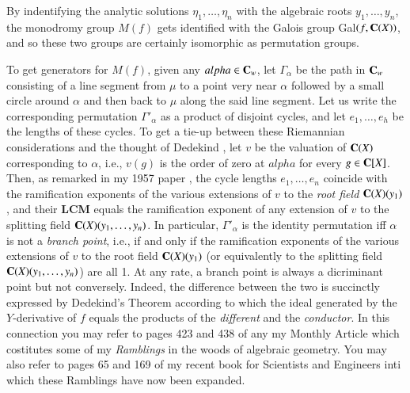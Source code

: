By indentifying the analytic solutions $\eta_{1}, \ldots, \eta_{n}$ with the algebraic roots $y_{1}, \ldots, y_{n}$, the monodromy group $M(f)$ gets identified with the Galois group Gal$(f, \mathbf{C}(X))$, and so these two groups are certainly isomorphic as permutation groups.

To get generators for $M(f)$, given any $alpha \in \mathbf{C}_{w}$, let $\Gamma_{\alpha}$ be the path in $\mathbf{C}_{w}$ consisting of a line segment from $\mu$ to a point very near $\alpha$ followed by a small circle around $\alpha$ and then back to $\mu$ along the said line segment. Let us write the corresponding permutation $\Gamma'_{\alpha}$ as a product of disjoint cycles, and let $e_{1}, \ldots, e_{h}$ be the lengths of these cycles. To get a tie-up between  these Riemannian considerations and the  thought of Dedekind \cite{art1-key28}, let $v$ be the valuation of $\mathbf{C}(X)$ corresponding to $\alpha$, i.e., $v(g)$ is the order of zero at $alpha$ for every $g\in \mathbf{C}[X]$. Then, as remarked in my 1957 paper \cite{art1-key3}, the cycle lengths $e_{1}, \ldots, e_{n}$ coincide with the ramification exponents of the various extensions of $v$ to the \textit{root field} $\mathbf{C}(X)(y_{1})$, and their {\bf LCM} equals the ramification exponent of any extension of $v$ to the splitting field $\mathbf{C}(X)(y_{1}, \ldots,y_{n})$. In particular, $\Gamma'_{\alpha}$ is the identity permutation iff $\alpha$ is not a \textit{branch point}, i.e., if and only if the ramification exponents of the various extensions of $v$ to the root field $\mathbf{C}(X)(y_{1})$ (or equivalently to the splitting field $\mathbf{C}(X)(y_{1},\ldots, y_{n})$) are all 1. At any rate, a branch point is always a dicriminant point but not conversely. Indeed, the difference between the two is succinctly expressed by Dedekind's Theorem according to which the ideal generated by the $Y$-derivative of $f$ equals the products of the \textit{different} and the \textit{conductor}. In this connection you may refer to pages 423 and 438 of any my Monthly Article\cite{art1-key5} which costitutes some of my \textit{Ramblings} in the woods of algebraic geometry. You may also refer to pages 65 and 169 of my recent book \cite{art1-key6} for Scientists and Engineers inti which these Ramblings have now been expanded.
  
